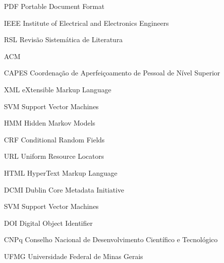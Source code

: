 
\begin{siglas}
  \item[PDF] Portable Document Format
  \item[IEEE] Institute of Electrical and Electronics Engineers
  \item[RSL] Revisão Sistemática de Literatura
  \item[ACM] 
  \item[CAPES] Coordenação de Aperfeiçoamento de Pessoal de Nível Superior
  \item[XML] eXtensible Markup Language
  \item[SVM] Support Vector Machines
  \item[HMM] Hidden Markov Models
  \item[CRF] Conditional Random Fields
  \item[URL] Uniform Resource Locators
  \item[HTML] HyperText Markup Language
  \item[DCMI] Dublin Core Metadata Initiative
  \item[SVM] Support Vector Machines
  \item[DOI] Digital Object Identifier
  \item[CNPq] Conselho Nacional de Desenvolvimento Científico e Tecnológico
  \item[UFMG] Universidade Federal de Minas Gerais
\end{siglas}